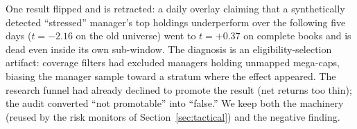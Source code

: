 One result flipped and is retracted: a daily overlay claiming that a
synthetically detected ``stressed'' manager's top holdings
underperform over the following five days ($t=-2.16$ on the old
universe) went to $t=+0.37$ on complete books and is dead even inside
its own sub-window. The diagnosis is an eligibility-selection
artifact: coverage filters had excluded managers holding unmapped
mega-caps, biasing the manager sample toward a stratum where the
effect appeared. The research funnel had already declined to promote
the result (net returns too thin); the audit converted ``not
promotable'' into ``false.'' We keep both the machinery (reused by
the risk monitors of Section~\ref{sec:tactical}) and the negative
finding.

